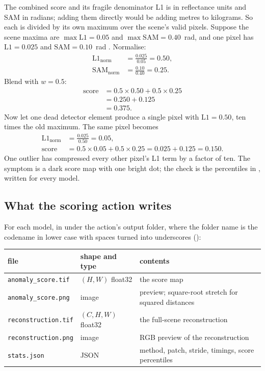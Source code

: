 \begin{worked}[label={we:inference:combined}]{The combined score and its fragile denominator}
L1 is in reflectance units and SAM in radians; adding them directly would be adding metres to kilograms. So
each is divided by its own maximum over the scene's valid pixels. Suppose the scene maxima are
$\max\text{L1}=0.05$ and $\max\text{SAM}=0.40$~rad, and one pixel has $\text{L1}=0.025$ and
$\text{SAM}=0.10$~rad \tagA. Normalise:
\begin{align*}
\text{L1}_{\text{norm}} &= \frac{0.025}{0.05} = 0.50,\\
\text{SAM}_{\text{norm}} &= \frac{0.10}{0.40} = 0.25.
\end{align*}
Blend with $w=0.5$:
\begin{align*}
\text{score} &= 0.5\times0.50 + 0.5\times0.25\\
&= 0.250 + 0.125\\
&= 0.375.
\end{align*}
Now let one dead detector element produce a single pixel with $\text{L1}=0.50$, ten times the old maximum.
The same pixel becomes
\begin{align*}
\text{L1}_{\text{norm}} &= \frac{0.025}{0.50} = 0.05,\\
\text{score} &= 0.5\times0.05 + 0.5\times0.25 = 0.025 + 0.125 = 0.150.
\end{align*}
One outlier has compressed every other pixel's L1 term by a factor of ten. The symptom is a dark score map
with one bright dot; the check is the percentiles in , written for every model.
\end{worked}

\subsection{What the scoring action writes}

For each model, in  under the action's output folder, where the folder name is the
codename in lower case with spaces turned into underscores ():

\begin{center}\small
\begin{tabular}{@{}lll@{}}
\toprule
file & shape and type & contents\\
\midrule
\texttt{anomaly\_score.tif} & $(H,W)$ float32 & the score map\\
\texttt{anomaly\_score.png} & image & preview; square-root stretch for squared distances\\
\texttt{reconstruction.tif} & $(C,H,W)$ float32 & the full-scene reconstruction\\
\texttt{reconstruction.png} & image & RGB preview of the reconstruction\\
\texttt{stats.json} & JSON & method, patch, stride, timings, score percentiles\\
\bottomrule
\end{tabular}
\end{center}


